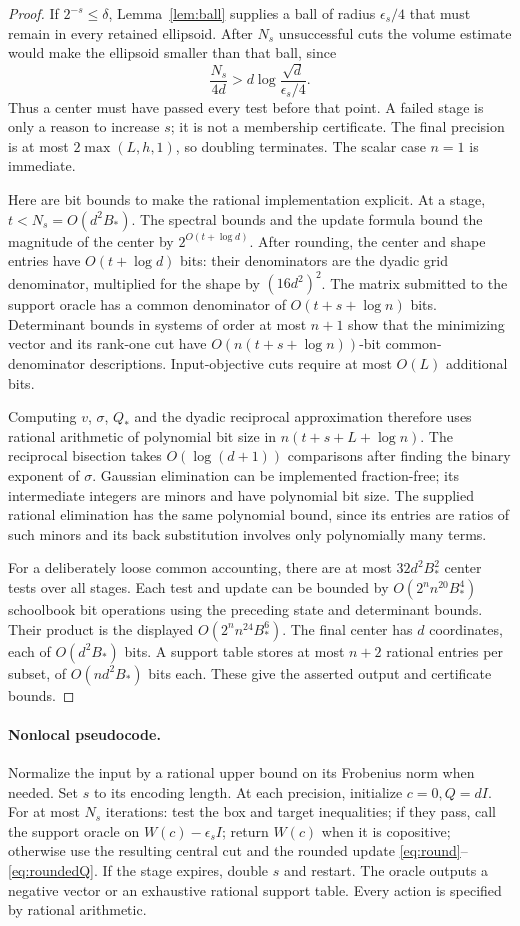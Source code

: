 \documentclass[11pt]{article}
\theoremstyle{remark}\newtheorem{remark}[theorem]{Remark}
\begin{document}
\begin{proof}
If $2^{-s}\le\delta$, Lemma~\ref{lem:ball} supplies a ball of radius $\epsilon_s/4$ that must remain in every retained ellipsoid. After $N_s$ unsuccessful cuts the volume estimate would make the ellipsoid smaller than that ball, since
\[
 \frac{N_s}{4d}>d\log\frac{\sqrt d}{\epsilon_s/4}.
\]
Thus a center must have passed every test before that point. A failed stage is only a reason to increase $s$; it is not a membership certificate. The final precision is at most $2\max(L,h,1)$, so doubling terminates. The scalar case $n=1$ is immediate.

Here are bit bounds to make the rational implementation explicit. At a stage, $t<N_s=O(d^2B_*)$. The spectral bounds and the update formula bound the magnitude of the center by $2^{O(t+\log d)}$. After rounding, the center and shape entries have $O(t+\log d)$ bits: their denominators are the dyadic grid denominator, multiplied for the shape by $(16d^2)^2$. The matrix submitted to the support oracle has a common denominator of $O(t+s+\log n)$ bits. Determinant bounds in systems of order at most $n+1$ show that the minimizing vector and its rank-one cut have $O(n(t+s+\log n))$-bit common-denominator descriptions. Input-objective cuts require at most $O(L)$ additional bits.

Computing $v$, $\sigma$, $Q_*$ and the dyadic reciprocal approximation therefore uses rational arithmetic of polynomial bit size in $n(t+s+L+\log n)$. The reciprocal bisection takes $O(\log(d+1))$ comparisons after finding the binary exponent of $\sigma$. Gaussian elimination can be implemented fraction-free; its intermediate integers are minors and have polynomial bit size. The supplied rational elimination has the same polynomial bound, since its entries are ratios of such minors and its back substitution involves only polynomially many terms.

For a deliberately loose common accounting, there are at most $32d^2B_*^2$ center tests over all stages. Each test and update can be bounded by $O(2^n n^{20}B_*^4)$ schoolbook bit operations using the preceding state and determinant bounds. Their product is the displayed $O(2^n n^{24}B_*^6)$. The final center has $d$ coordinates, each of $O(d^2B_*)$ bits. A support table stores at most $n+2$ rational entries per subset, of $O(nd^2B_*)$ bits each. These give the asserted output and certificate bounds.
\end{proof}

\paragraph{Nonlocal pseudocode.}
Normalize the input by a rational upper bound on its Frobenius norm when needed. Set $s$ to its encoding length. At each precision, initialize $c=0,Q=dI$. For at most $N_s$ iterations: test the box and target inequalities; if they pass, call the support oracle on $W(c)-\epsilon_s I$; return $W(c)$ when it is copositive; otherwise use the resulting central cut and the rounded update \eqref{eq:round}--\eqref{eq:roundedQ}. If the stage expires, double $s$ and restart. The oracle outputs a negative vector or an exhaustive rational support table. Every action is specified by rational arithmetic.
\end{document}
